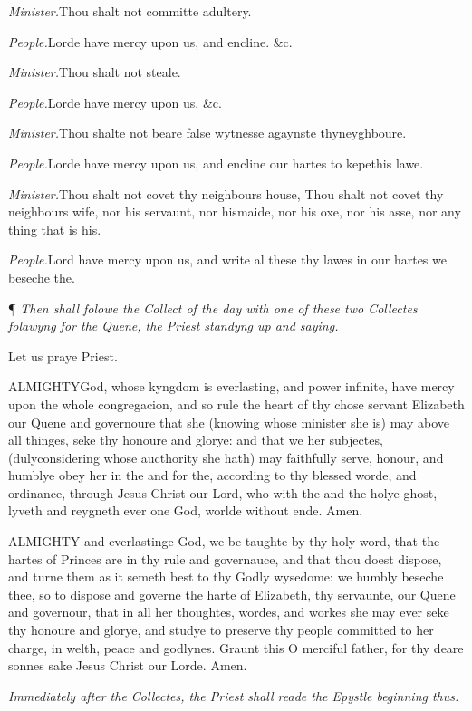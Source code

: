 \emph{Minister.}Thou shalt
not committe adultery.

\emph{People.}Lorde have mercy
upon us, and encline. \&c.

\emph{Minister.}Thou shalt
not steale.

\emph{People.}Lorde have mercy
upon us, \&c.

\emph{Minister.}Thou shalte
not beare false wytnesse agaynste thy\textbf{}neyghboure.

\emph{People.}Lorde have mercy
upon us, and encline our hartes to kepe\textbf{}this lawe.

\emph{Minister.}Thou shalt
not covet thy neighbours house, Thou shalt not covet thy neighbours wife,
nor his servaunt, nor his\textbf{}maide, nor his oxe, nor his asse, nor
any thing that is his.

\emph{People.}Lord have mercy
upon us, and write al these thy lawes in our hartes we beseche the.

¶
\emph{Then shall folowe the Collect of the day with one of these two Collectes
folawyng for the Quene, the Priest standyng up and saying.}

Let
us praye Priest.

ALMIGHTY\textbf{}God, whose kyngdom is everlasting, and power infinite, have mercy
upon the whole congregacion, and so rule the heart of thy chose servant
Elizabeth our Quene and governoure that she (knowing whose minister she
is) may above all thinges, seke thy honoure and glorye: and that we her
subjectes, (duly\textbf{}considering whose aucthority she hath) may faithfully
serve, honour, and humblye obey her in the and for the, according to thy
blessed worde, and ordinance, through Jesus Christ our Lord, who with
the and the holye ghost, lyveth and reygneth ever one God, worlde without
ende. Amen.

ALMIGHTY
and everlastinge God, we be taughte by thy holy word, that the hartes
of Princes are in thy rule and governauce, and that thou doest dispose,
and turne them as it semeth best to thy Godly wysedome: we humbly beseche
thee, so to dispose and governe the harte of Elizabeth, thy servaunte,
our Quene and governour, that in all her thoughtes, wordes, and workes
she may ever seke thy honoure and glorye, and studye to preserve thy people
committed to her charge, in welth, peace and godlynes. Graunt this O merciful
father, for thy deare sonnes sake Jesus Christ our Lorde. Amen.

\emph{Immediately
after the Collectes, the Priest shall reade the Epystle beginning thus.}

